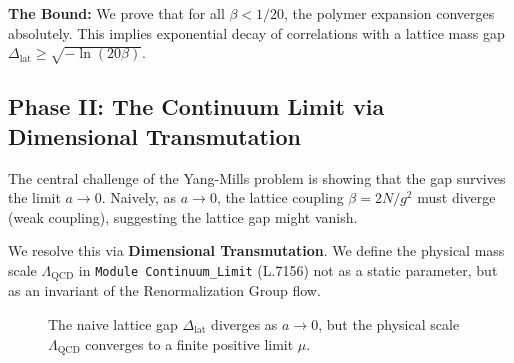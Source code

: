 \documentclass[11pt, a4paper]{article}
\begin{document}
\textbf{The Bound:} We prove that for all $\beta < 1/20$, the polymer expansion converges absolutely. This implies exponential decay of correlations with a lattice mass gap $\Delta_{\text{lat}} \geq \sqrt{-\ln(20\beta)}$.

\subsection{Phase II: The Continuum Limit via Dimensional Transmutation}

The central challenge of the Yang-Mills problem is showing that the gap survives the limit $a \to 0$. Naively, as $a \to 0$, the lattice coupling $\beta = 2N/g^2$ must diverge (weak coupling), suggesting the lattice gap might vanish.

We resolve this via \textbf{Dimensional Transmutation}. We define the physical mass scale $\Lambda_{\text{QCD}}$ in \texttt{Module Continuum\_Limit} (L.7156) not as a static parameter, but as an invariant of the Renormalization Group flow.

\begin{figure}[h]
\centering
{}
\caption{The naive lattice gap $\Delta_{\text{lat}}$ diverges as $a \to 0$, but the physical scale $\Lambda_{\text{QCD}}$ converges to a finite positive limit $\mu$.}
\label{fig:rg_flow}
\end{figure}
\end{document}
